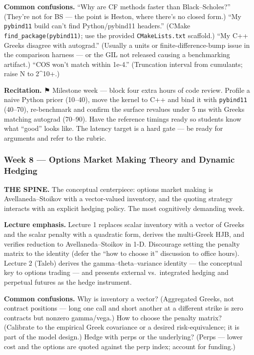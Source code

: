 \documentclass[
]{article}
\begin{document}
\textbf{Common confusions.} ``Why are CF methods faster than
Black--Scholes?'' (They're not for BS --- the point is Heston, where
there's no closed form.) ``My \texttt{pybind11} build can't find
Python/pybind11 headers.'' (CMake \texttt{find\_package(pybind11)}; use
the provided \texttt{CMakeLists.txt} scaffold.) ``My C++ Greeks disagree
with autograd.'' (Usually a units or finite-difference-bump issue in the
comparison harness --- or the GIL not released causing a benchmarking
artifact.) ``COS won't match within 1e-4.'' (Truncation interval from
cumulants; raise N to 2\^{}10+.)

\textbf{Recitation.} ⚑ Milestone week --- block four extra hours of code
review. Profile a naive Python pricer (10--40), move the kernel to C++
and bind it with \texttt{pybind11} (40--70), re-benchmark and confirm
the surface revalues under 5 ms with Greeks matching autograd (70--90).
Have the reference timings ready so students know what ``good'' looks
like. The latency target is a hard gate --- be ready for arguments and
refer to the rubric.

\subsubsection{Week 8 --- Options Market Making Theory and Dynamic
Hedging}\label{week-8-options-market-making-theory-and-dynamic-hedging}

\textbf{THE SPINE.} The conceptual centerpiece: options market making is
Avellaneda--Stoikov with a vector-valued inventory, and the quoting
strategy interacts with an explicit hedging policy. The most cognitively
demanding week.

\textbf{Lecture emphasis.} Lecture 1 replaces scalar inventory with a
vector of Greeks and the scalar penalty with a quadratic form, derives
the multi-Greek HJB, and verifies reduction to Avellaneda--Stoikov in
1-D. Discourage setting the penalty matrix to the identity (defer the
``how to choose it'' discussion to office hours). Lecture 2 (Taleb)
derives the gamma--theta--variance identity --- the conceptual key to
options trading --- and presents external vs.~integrated hedging and
perpetual futures as the hedge instrument.

\textbf{Common confusions.} Why is inventory a vector? (Aggregated
Greeks, not contract positions --- long one call and short another at a
different strike is zero contracts but nonzero gamma/vega.) How to
choose the penalty matrix? (Calibrate to the empirical Greek covariance
or a desired risk-equivalence; it is part of the model design.) Hedge
with perps or the underlying? (Perps --- lower cost and the options are
quoted against the perp index; account for funding.)
\end{document}
